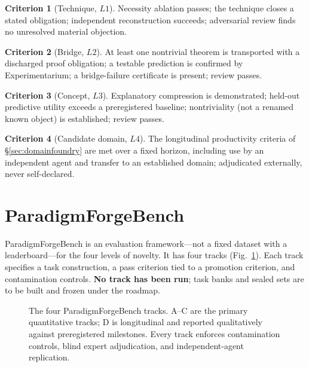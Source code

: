 \documentclass[11pt]{article}
\theoremstyle{definition}
\newtheorem{criterion}{Criterion}
\theoremstyle{remark}
\newcommand{\pfbench}{ParadigmForgeBench}
\begin{document}
\begin{criterion}[Technique, $L1$]
Necessity ablation passes; the technique closes a stated obligation; independent reconstruction
succeeds; adversarial review finds no unresolved material objection.
\end{criterion}
\begin{criterion}[Bridge, $L2$]
At least one nontrivial theorem is transported with a discharged proof obligation; a testable
prediction is confirmed by Experimentarium; a bridge-failure certificate is present; review passes.
\end{criterion}
\begin{criterion}[Concept, $L3$]
Explanatory compression is demonstrated; held-out predictive utility exceeds a preregistered
baseline; nontriviality (not a renamed known object) is established; review passes.
\end{criterion}
\begin{criterion}[Candidate domain, $L4$]
The longitudinal productivity criteria of \S\ref{sec:domainfoundry} are met over a fixed horizon,
including use by an independent agent and transfer to an established domain; adjudicated externally,
never self-declared.
\end{criterion}

\section{ParadigmForgeBench}
\label{sec:bench}

\pfbench{} is an evaluation framework---not a fixed dataset with a leaderboard---for the four levels
of novelty. It has four tracks (Fig.~\ref{fig:tracks}). Each track specifies a task construction, a
pass criterion tied to a promotion criterion, and contamination controls. \textbf{No track has been
run}; task banks and sealed sets are to be built and frozen under the roadmap.

\begin{figure}[t]
\centering
\resizebox{\textwidth}{!}{}
\caption{The four \pfbench{} tracks. A--C are the primary quantitative tracks; D is longitudinal and
reported qualitatively against preregistered milestones. Every track enforces contamination controls,
blind expert adjudication, and independent-agent replication.}
\label{fig:tracks}
\end{figure}
\end{document}
